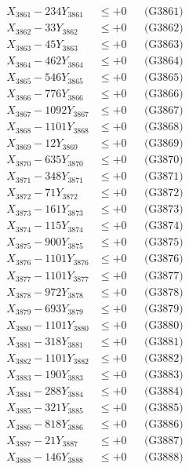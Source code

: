 \documentclass[a4paper,10pt]{article}
\begin{document}
{\begin{align}
\allowbreak
X_{3861} - 234Y_{3861} &\leq +0 && \text{(G3861)} \\
X_{3862} - 33Y_{3862} &\leq +0 && \text{(G3862)} \\
X_{3863} - 45Y_{3863} &\leq +0 && \text{(G3863)} \\
X_{3864} - 462Y_{3864} &\leq +0 && \text{(G3864)} \\
X_{3865} - 546Y_{3865} &\leq +0 && \text{(G3865)} \\
X_{3866} - 776Y_{3866} &\leq +0 && \text{(G3866)} \\
X_{3867} - 1092Y_{3867} &\leq +0 && \text{(G3867)} \\
X_{3868} - 1101Y_{3868} &\leq +0 && \text{(G3868)} \\
X_{3869} - 12Y_{3869} &\leq +0 && \text{(G3869)} \\
X_{3870} - 635Y_{3870} &\leq +0 && \text{(G3870)} \\
\allowbreak
X_{3871} - 348Y_{3871} &\leq +0 && \text{(G3871)} \\
X_{3872} - 71Y_{3872} &\leq +0 && \text{(G3872)} \\
X_{3873} - 161Y_{3873} &\leq +0 && \text{(G3873)} \\
X_{3874} - 115Y_{3874} &\leq +0 && \text{(G3874)} \\
X_{3875} - 900Y_{3875} &\leq +0 && \text{(G3875)} \\
X_{3876} - 1101Y_{3876} &\leq +0 && \text{(G3876)} \\
X_{3877} - 1101Y_{3877} &\leq +0 && \text{(G3877)} \\
X_{3878} - 972Y_{3878} &\leq +0 && \text{(G3878)} \\
X_{3879} - 693Y_{3879} &\leq +0 && \text{(G3879)} \\
X_{3880} - 1101Y_{3880} &\leq +0 && \text{(G3880)} \\
\allowbreak
X_{3881} - 318Y_{3881} &\leq +0 && \text{(G3881)} \\
X_{3882} - 1101Y_{3882} &\leq +0 && \text{(G3882)} \\
X_{3883} - 190Y_{3883} &\leq +0 && \text{(G3883)} \\
X_{3884} - 288Y_{3884} &\leq +0 && \text{(G3884)} \\
X_{3885} - 321Y_{3885} &\leq +0 && \text{(G3885)} \\
X_{3886} - 818Y_{3886} &\leq +0 && \text{(G3886)} \\
X_{3887} - 21Y_{3887} &\leq +0 && \text{(G3887)} \\
X_{3888} - 146Y_{3888} &\leq +0 && \text{(G3888)} \\

\end{align}}
\end{document}
